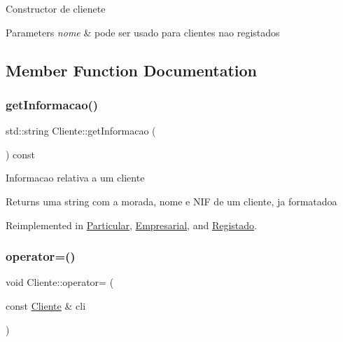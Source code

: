Constructor de clienete 
\begin{DoxyParams}{Parameters}
{\em nome} & pode ser usado para clientes nao registados \\
\hline
\end{DoxyParams}


\subsection{Member Function Documentation}
\mbox{\label{class_cliente_a932ef71b2792dc5df153f82d3e81a6f3}} 
\subsubsection{\texorpdfstring{get\+Informacao()}{getInformacao()}}
{\footnotesize\ttfamily std\+::string Cliente\+::get\+Informacao (\begin{DoxyParamCaption}{ }\end{DoxyParamCaption}) const\hspace{0.3cm}{\ttfamily [virtual]}}

Informacao relativa a um cliente

\begin{DoxyReturn}{Returns}
uma string com a morada, nome e N\+IF de um cliente, ja formatadoa 
\end{DoxyReturn}


Reimplemented in \hyperlink{class_particular_acde85dcb3d26ca3afe131fb4c35763c8}{Particular}, \hyperlink{class_empresarial_a28090b6b3db16b6b7ba03d6308c2c309}{Empresarial}, and \hyperlink{class_registado_a7017f0d74afd44459c3d6affcb303d52}{Registado}.

\mbox{\label{class_cliente_a3aa84b64135b106669724fc08b7cc91f}} 
\subsubsection{\texorpdfstring{operator=()}{operator=()}}
{\footnotesize\ttfamily void Cliente\+::operator= (\begin{DoxyParamCaption}\item[{const \hyperlink{class_cliente}{Cliente} \&}]{cli }\end{DoxyParamCaption})}

